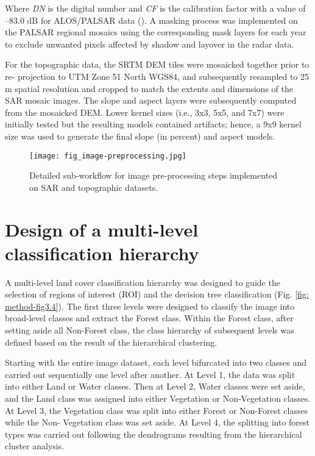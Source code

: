 \noindent Where \textit{DN} is the digital number and \textit{CF} is the calibration factor with a value of –83.0 dB for ALOS/PALSAR data (\cite{rosenqvist_alos_2007}). A masking process was implemented on the PALSAR regional mosaics using the corresponding mask layers for each year to exclude unwanted pixels affected by shadow and layover in the radar data.

For the topographic data, the SRTM DEM tiles were mosaicked together prior to re- projection to UTM Zone 51 North WGS84, and subsequently resampled to 25 m spatial resolution and cropped to match the extents and dimensions of the SAR mosaic images. The slope and aspect layers were subsequently computed from the mosaicked DEM. Lower kernel sizes (i.e., 3x3, 5x5, and 7x7) were initially tested but the resulting models contained artifacts; hence, a 9x9 kernel size was used to generate the final slope (in percent) and aspect models.

\begin{figure}
	\centering
	\texttt{[image: fig\_image-preprocessing.jpg]}
	\caption[Detailed sub-workflow for image pre-processing steps implemented on SAR and topographic datasets.]{Detailed sub-workflow for image pre-processing steps implemented on SAR and topographic datasets.}
	\label{fig: method-fig3.3}
\end{figure}

\section{Design of a multi-level classification hierarchy}
\label{sec: method-class-hierarchy}

A multi-level land cover classification hierarchy was designed to guide the selection of regions of interest (ROI) and the decision tree classification (Fig. \ref{fig: method-fig3.4}). The first three levels were designed to classify the image into broad-level classes and extract the Forest class. Within the Forest class, after setting aside all Non-Forest class, the class hierarchy of subsequent levels was defined based on the result of the hierarchical clustering.

Starting with the entire image dataset, each level bifurcated into two classes and carried out sequentially one level after another. At Level 1, the data was split into either Land or Water classes. Then at Level 2, Water classes were set aside, and the Land class was assigned into either Vegetation or Non-Vegetation classes. At Level 3, the Vegetation class was split into either Forest or Non-Forest classes while the Non- Vegetation class was set aside. At Level 4, the splitting into forest types was carried out following the dendrograms resulting from the hierarchical cluster analysis.

